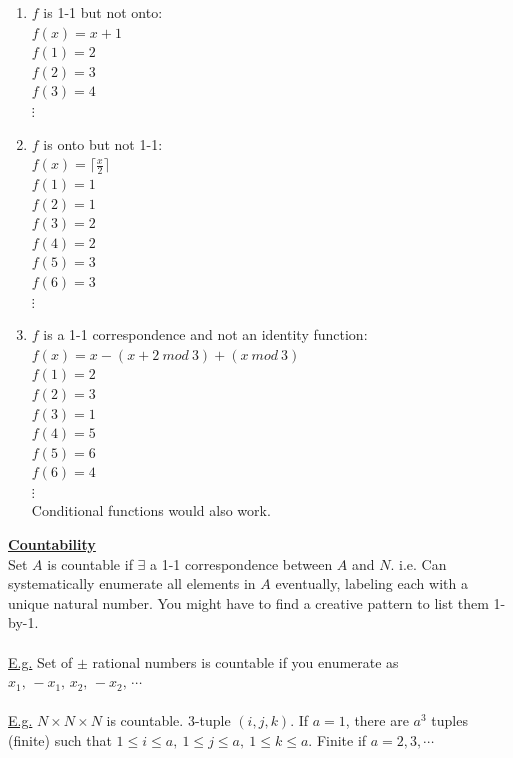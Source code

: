 \documentclass[8pt,letterpaper,twocolumn]{article}
\begin{document}
\begin{enumerate}
  \item $f$ is 1-1 but not onto:\\
  $f(x) = x + 1$\\
  $f(1) = 2$\\
  $f(2) = 3$\\
  $f(3) = 4$\\
  $\vdots$
  
  \item $f$ is onto but not 1-1:\\
  $f(x) = \lceil \frac{x}{2} \rceil$\\
  $f(1) = 1$\\
  $f(2) = 1$\\
  $f(3) = 2$\\
  $f(4) = 2$\\
  $f(5) = 3$\\
  $f(6) = 3$\\
  $\vdots$
  
  \item $f$ is a 1-1 correspondence and not an identity function:\\
  $f(x) = x - (x + 2 \: mod \: 3) + (x \: mod \: 3)$\\
  $f(1) = 2$\\
  $f(2) = 3$\\
  $f(3) = 1$\\
  $f(4) = 5$\\
  $f(5) = 6$\\
  $f(6) = 4$\\
  $\vdots$\\
  Conditional functions would also work.
\end{enumerate}
\underline{\textbf{Countability}}\\
Set $A$ is countable if $\exists$ a 1-1 correspondence between $A$ and $N$.
i.e. Can systematically enumerate all elements in $A$ eventually, labeling each with
a unique natural number. You might have to find a creative pattern to list them 1-by-1.\\
\\
\underline{E.g.} Set of $\pm$ rational numbers is countable if you enumerate as
$x_1, \, -x_1, \, x_2, \, -x_2, \, \cdots$\\
\\
\underline{E.g.} $N \times N \times N$ is countable. 3-tuple $(i,j,k)$.
If $a=1$, there are $a^3$ tuples (finite) such that
$1 \leq i \leq a, \: 1 \leq j \leq a, \: 1 \leq k \leq a$.
Finite if $a=2,3,\cdots$\\
\end{document}
